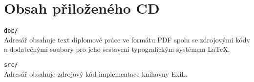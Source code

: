 \section{Obsah přiloženého CD}

\hangindent=1cm
\parskip=0.3cm
\noindent{}\verb|doc/| \\
Adresář obsahuje text diplomové práce ve formátu PDF spolu se zdrojovými kódy a
dodatečnými soubory pro jeho sestavení typografickým systémem \LaTeX.

\hangindent=1cm
\noindent{}\verb|src/| \\
Adresář obsahuje zdrojový kód implementace knihovny ExiL.
